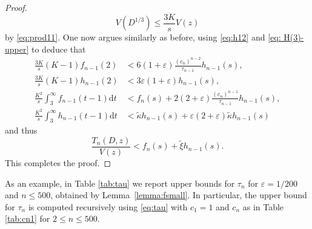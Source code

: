 \documentclass[12pt]{amsart}
\begin{document}
\begin{proof}
\begin{equation*}
    V(D^{1/3})\le\frac{3K}{s}V(z)
\end{equation*}
by \eqref{eq:prod11}. One now argues similarly as before, using \eqref{eq:h12} and \eqref{eq: H(3)-upper} to deduce that
\begin{align*}
    \frac{3K}{s}(K-1)f_{n-1}(2)&<6(1+\varepsilon)\frac{(c_n)^{n-2}}{\tau_{n-1}}h_{n-1}(s),\\
    \frac{3K}{s}(K-1)h_{n-1}(2)&<3\varepsilon(1+\varepsilon)h_{n-1}(s),\\
    \frac{K^2}{s}\int_{3}^\infty f_{n-1}(t-1)\mathrm{d}t&<f_n(s)+2(2+\varepsilon)\frac{(c_n)^{n-1}}{\tau_{n-1}}h_{n-1}(s),\\
    \frac{K^2}{s}\int_{3}^\infty h_{n-1}(t-1)\mathrm{d}t&<\tilde{\kappa}h_{n-1}(s)+\varepsilon(2+\varepsilon)\tilde{\kappa}h_{n-1}(s)
\end{align*}
and thus
\begin{equation*}
    \frac{T_{n}(D,z)}{V(z)}<f_n(s)+\tilde{\xi}h_{n-1}(s).
\end{equation*}
This completes the proof.
\end{proof}

As an example, in Table \ref{tab:tau} we report upper bounds for $\tau_n$ for $\varepsilon=1/200$ and $n\le 500$, obtained by Lemma~\ref{lemma:fsmall}. In particular, the upper bound for $\tau_n$ is computed recursively using \eqref{eq:tau} with $c_1=1$ and $c_n$ as in Table \ref{tab:cn1} for $2\leq n\leq 500$.
\end{document}
